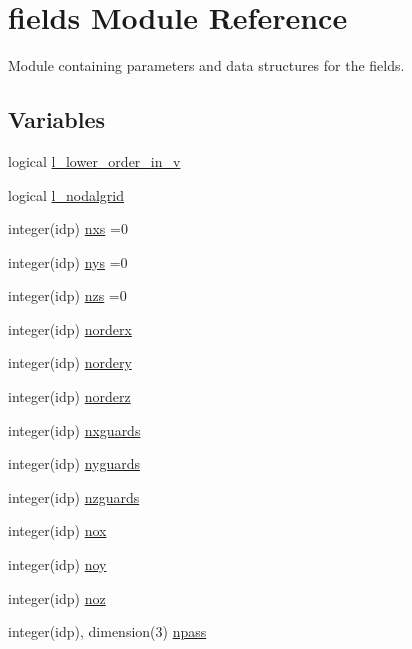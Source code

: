 \hypertarget{namespacefields}{}\section{fields Module Reference}
\label{namespacefields}


Module containing parameters and data structures for the fields.  


\subsection*{Variables}
\begin{DoxyCompactItemize}
\item 
logical \hyperlink{namespacefields_a5a24e83e3fb185459ab237b37188c1d8}{l\+\_\+lower\+\_\+order\+\_\+in\+\_\+v}
\item 
logical \hyperlink{namespacefields_ab18c95cb8d4e80527bd87db458526d68}{l\+\_\+nodalgrid}
\item 
integer(idp) \hyperlink{namespacefields_a930a275ec3d0c2c725a19a016cf140f0}{nxs} =0
\item 
integer(idp) \hyperlink{namespacefields_adc125104f8f7666c683e307ad9703412}{nys} =0
\item 
integer(idp) \hyperlink{namespacefields_aa0a3c8b650acfd6add1cfe59383b4b0e}{nzs} =0
\item 
integer(idp) \hyperlink{namespacefields_a5db7070b5dbdeed3416e2ab8405978ef}{norderx}
\item 
integer(idp) \hyperlink{namespacefields_a9f1111bb7c59399b756f2fcb13db9285}{nordery}
\item 
integer(idp) \hyperlink{namespacefields_a1ed7522a1b4a7bc6460525f798d1619e}{norderz}
\item 
integer(idp) \hyperlink{namespacefields_a4ac76b76df65c6d646d63da6b1cd642c}{nxguards}
\item 
integer(idp) \hyperlink{namespacefields_ad86b91ec6fa696f154aebb594c867bf2}{nyguards}
\item 
integer(idp) \hyperlink{namespacefields_a08a746304a8f4b59076abee85eb82642}{nzguards}
\item 
integer(idp) \hyperlink{namespacefields_a9a721e4dba76280df41937c60a91e390}{nox}
\item 
integer(idp) \hyperlink{namespacefields_ae0f614311e278825c771b1b6fa3d0596}{noy}
\item 
integer(idp) \hyperlink{namespacefields_a30badcbccf6fb02a7301a38cb9d27eff}{noz}
\item 
integer(idp), dimension(3) \hyperlink{namespacefields_ab87cdb3a2fad3969d058285da9197868}{npass}

\end{DoxyCompactItemize}
